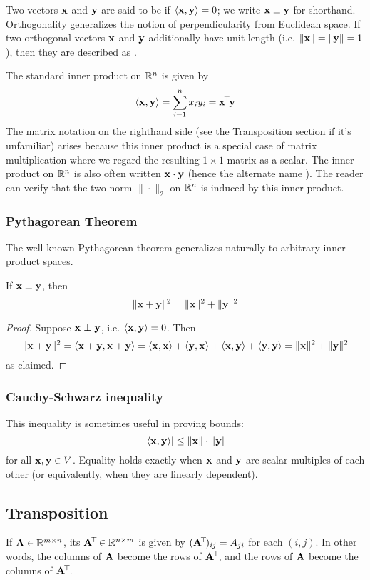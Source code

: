 Two vectors $\mathbf{x}$ and $\mathbf{y}$ are said to be  if $\langle \mathbf{x}, \mathbf{y} \rangle = 0$; we write $\mathbf{x} \perp \mathbf{y}$ for shorthand.
Orthogonality generalizes the notion of perpendicularity from Euclidean space.
If two orthogonal vectors $\mathbf{x}$ and $\mathbf{y}$ additionally have unit length (i.e. $\|\mathbf{x}\| = \|\mathbf{y}\| = 1$), then they are described as .

The standard inner product on $\mathbb{R}^n$ is given by
\[\langle \mathbf{x}, \mathbf{y} \rangle = \sum_{i=1}^n x_iy_i = \mathbf{x}^{\!\top\!}\mathbf{y}\]
The matrix notation on the righthand side (see the Transposition section if it's unfamiliar) arises because this inner product is a special case of matrix multiplication where we regard the resulting $1 \times 1$ matrix as a scalar.
The inner product on $\mathbb{R}^n$ is also often written $\mathbf{x}\cdot\mathbf{y}$ (hence the alternate name ).
The reader can verify that the two-norm $\|\cdot\|_2$ on $\mathbb{R}^n$ is induced by this inner product.

\subsubsection{Pythagorean Theorem}
The well-known Pythagorean theorem generalizes naturally to arbitrary inner product spaces.
\begin{theorem}
If $\mathbf{x} \perp \mathbf{y}$, then
\[\|\mathbf{x}+\mathbf{y}\|^2 = \|\mathbf{x}\|^2 + \|\mathbf{y}\|^2\]
\end{theorem}
\begin{proof}
Suppose $\mathbf{x} \perp \mathbf{y}$, i.e. $\langle \mathbf{x}, \mathbf{y} \rangle = 0$. Then
\[\|\mathbf{x}+\mathbf{y}\|^2 = \langle \mathbf{x}+\mathbf{y}, \mathbf{x}+\mathbf{y} \rangle = \langle \mathbf{x}, \mathbf{x} \rangle + \langle \mathbf{y}, \mathbf{x} \rangle + \langle \mathbf{x}, \mathbf{y} \rangle + \langle \mathbf{y}, \mathbf{y} \rangle = \|\mathbf{x}\|^2 + \|\mathbf{y}\|^2\]
as claimed.
\end{proof}

\subsubsection{Cauchy-Schwarz inequality}
This inequality is sometimes useful in proving bounds:
\[|\langle \mathbf{x}, \mathbf{y} \rangle| \leq \|\mathbf{x}\| \cdot \|\mathbf{y}\|\]
for all $\mathbf{x}, \mathbf{y} \in V$. Equality holds exactly when $\mathbf{x}$ and $\mathbf{y}$ are scalar multiples of each other (or equivalently, when they are linearly dependent).

\subsection{Transposition}
If $\mathbf{A} \in \mathbb{R}^{m \times n}$, its  $\mathbf{A}^{\!\top\!} \in \mathbb{R}^{n \times m}$ is given by $(\mathbf{A}^{\!\top\!})_{ij} = A_{ji}$ for each $(i, j)$.
In other words, the columns of $\mathbf{A}$ become the rows of $\mathbf{A}^{\!\top\!}$, and the rows of $\mathbf{A}$ become the columns of $\mathbf{A}^{\!\top\!}$.

